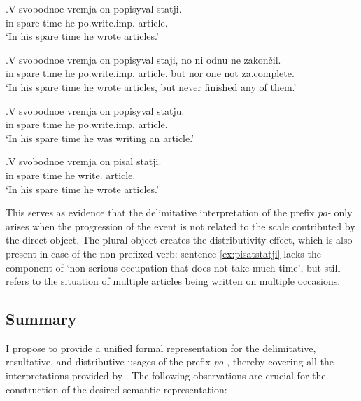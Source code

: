 \exg.\label{ex:popisyvat}V svobodnoe vremja on popisyval statji.\\
in spare time he po.write.imp. article.\\
\trans `In his spare time he wrote articles.'

\exg.\label{ex:popisyvat:none}V svobodnoe vremja on popisyval staji, no ni odnu ne zakon\v{c}il.\\
in spare time he po.write.imp. article. but nor one not za.complete.\\
\trans `In his spare time he wrote articles, but never finished any of them.'

\exg.\label{ex:popisyvat:single}V svobodnoe vremja on popisyval statju.\\
in spare time he po.write.imp. article.\\
\trans `In his spare time he was writing an article.'

\exg.\label{ex:pisatstatji}V svobodnoe vremja on pisal statji.\\
in spare time he write. article.\\
\trans `In his spare time he wrote articles.'

This serves as evidence that the delimitative interpretation of the prefix \textit{po-} only arises when the progression of the event is not related to the scale contributed by the direct object. The plural object creates the distributivity effect, which is also present in case of the non-prefixed verb: sentence \ref{ex:pisatstatji} lacks the component of `non-serious occupation that does not take much time', but still refers to the situation of multiple articles being written on multiple occasions. 

\subsection{Summary}
I propose to provide a unified formal representation for the delimitative, resultative, and distributive usages of the prefix \textit{po-}, thereby covering all the interpretations provided by \citet{Shvedova:82}. The following observations are crucial for the construction of the desired semantic representation:

